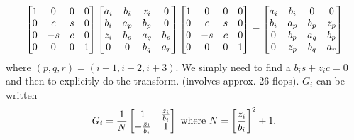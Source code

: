 \begin{align}
\left[\begin{matrix} 
1 & 0 & 0 & 0 \\
0 & c & s & 0 \\
0 & -s & c & 0 \\
0 & 0 & 0 & 1 
 \end{matrix}\right]
\left[\begin{matrix} 
a_i& b_i & z_i & 0 \\
b_i & a_p & b_p & 0 \\
z_i & b_p & a_q & b_p \\
0 & 0 & b_q & a_r 
 \end{matrix}\right]
\left[\begin{matrix} 
1 & 0 & 0 & 0 \\
0 & c & s & 0 \\
0 & -s & c & 0 \\
0 & 0 & 0 & 1 
 \end{matrix}\right]
=
\left[\begin{matrix} 
a_i& b_i & 0 & 0 \\
b_i & a_p & b_p & z_p \\
0 & b_p & a_q & b_p \\
0 & z_p & b_q & a_r 
 \end{matrix}\right]
\end{align}
where $(p,q,r)=(i+1, i+2, i+3)$. We simply need to find a $b_is+z_ic = 0$
and then to explicitly do the transform. (involves approx. 26 flops).
$G_i$ can be written 
\begin{align}
	G_i = \frac1{N}\left[\begin{matrix}  1 & \frac{z_i}{b_i} \\ -\frac{z_i}{b_i} & 1  \end{matrix}\right]
	\text{ where } N = \left[\frac{z_i}{b_i}\right]^2+1.
\end{align}

